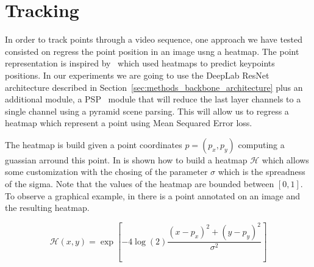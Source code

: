 \section{Tracking}
\label{sec:methods_tracking}

In order to track points through a video sequence, one approach we have tested consisted on regress the point position in an image usng a heatmap.
The point representation is inspired by~\cite{nam2016learning} which used heatmaps to predict keypoints positions.
In our experiments we are going to use the DeepLab ResNet architecture described in Section~\ref{sec:methods_backbone_architecture} plus an additional module, a PSP~\cite{zhao2017pyramid} module that will reduce the last layer channels to a single channel using a pyramid scene parsing.
This will allow us to regress a heatmap which represent a point using Mean Sequared Error loss.

The heatmap is build given a point coordinates $p = (p_x, p_y)$  computing a guassian arround this point.
In  is shown how to build a heatmap $\mathcal{H}$ which allows some customization with the chosing of the parameter $\sigma$ which is the spreadness of the sigma.
Note that the values of the heatmap are bounded between $[0, 1]$.
To observe a graphical example, in  there is a point annotated on an image and the resulting heatmap.

\begin{equation}
  \mathcal{H}(x, y) = \exp \left[ -4 \log(2) \frac{ (x - p_x)^2 + (y - p_y)^2 }{ \sigma^2 } \right]
  \label{eq:heatmap}
\end{equation}

